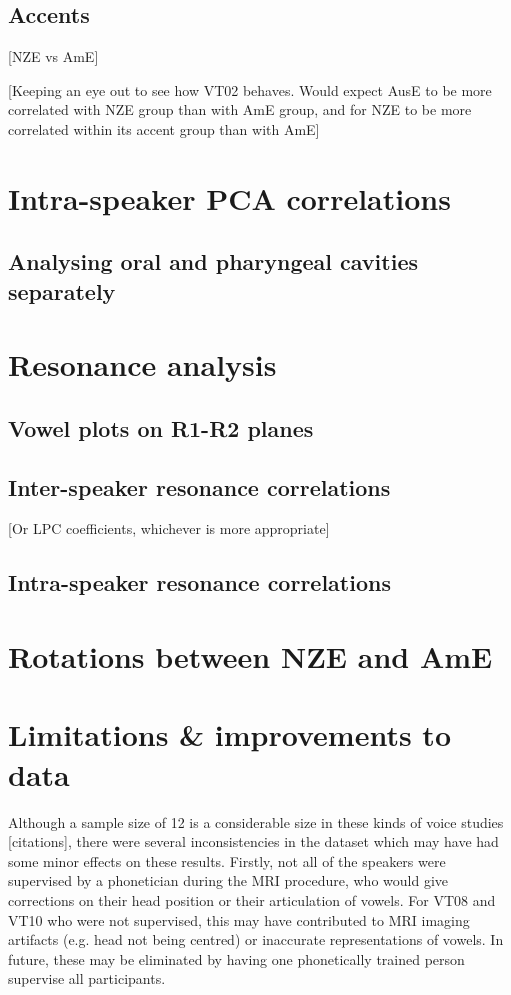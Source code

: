 \subsection{Accents}

[NZE vs AmE]

[Keeping an eye out to see how VT02 behaves. Would expect AusE to be more correlated with NZE group than with AmE group, and for NZE to be more correlated within its accent group than with AmE]

\section{Intra-speaker PCA correlations}

\subsection{Analysing oral and pharyngeal cavities separately}

\section{Resonance analysis}

\subsection{Vowel plots on R1-R2 planes}

\subsection{Inter-speaker resonance correlations}

[Or LPC coefficients, whichever is more appropriate]

\subsection{Intra-speaker resonance correlations}

\section{Rotations between NZE and AmE}

\section{Limitations \& improvements to data}

Although a sample size of 12 is a considerable size in these kinds of voice studies [citations], there were several inconsistencies in the dataset which may have had some minor effects on these results. Firstly, not all of the speakers were supervised by a phonetician during the MRI procedure, who would give corrections on their head position or their articulation of vowels. For VT08 and VT10 who were not supervised, this may have contributed to MRI imaging artifacts (e.g. head not being centred) or inaccurate representations of vowels. In future, these may be eliminated by having one phonetically trained person supervise all participants.

